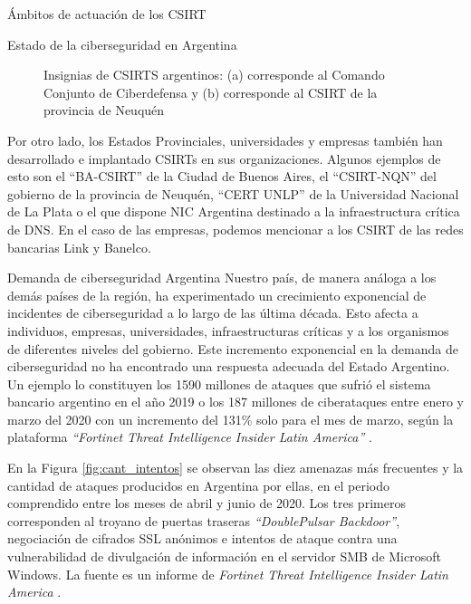 \begin{section}{Ámbitos de actuación de los CSIRT}
\begin{subsection}{Estado de la ciberseguridad en Argentina}
\begin{figure}[H]
            \quad
            \caption{Insignias de CSIRTS argentinos: (a) corresponde al Comando Conjunto de Ciberdefensa y (b) corresponde al CSIRT de la provincia de Neuquén}
            \label{fig:ciberdef_nqn}
        \end{figure}
        \FloatBarrier
        Por otro lado, los Estados Provinciales, universidades y empresas también han desarrollado e implantado CSIRTs en sus organizaciones. Algunos ejemplos de esto son el “BA-CSIRT”\cite{ba_csirt} de la Ciudad de Buenos Aires, el “CSIRT-NQN”\cite{nqn_csirt} del gobierno de la provincia de Neuquén, “CERT UNLP” \cite{unlp_cert} de la Universidad Nacional de La Plata o el que dispone NIC Argentina \cite{nic_arg} destinado a la infraestructura crítica de DNS. En el caso de las empresas, podemos mencionar a los CSIRT de las redes bancarias Link \cite{red_link} y Banelco\cite{banelco}.
            \begin{subsubsection}{Demanda de ciberseguridad Argentina}
            Nuestro país, de manera análoga a los demás países de la región, ha experimentado un crecimiento exponencial de incidentes de ciberseguridad a lo largo de las última década. Esto afecta a individuos, empresas, universidades, infraestructuras críticas y a los organismos de diferentes niveles del gobierno. Este incremento exponencial en la demanda de ciberseguridad no ha encontrado una respuesta adecuada del Estado Argentino. Un ejemplo lo constituyen los 1590 millones de ataques \cite{iProUP} que sufrió el sistema bancario argentino en el año 2019 o los 187 millones de ciberataques entre enero y marzo del 2020 con un incremento del 131\% solo para el mes de marzo, según la plataforma \textit{“Fortinet Threat Intelligence Insider Latin America”} \cite{fortinet}. \par 
            En la Figura \ref{fig:cant_intentos} se observan las diez amenazas más frecuentes y la cantidad de ataques producidos en Argentina por ellas, en el periodo comprendido entre los meses de abril y junio de 2020. Los tres primeros corresponden al troyano de puertas traseras \textit{“DoublePulsar Backdoor”}, negociación de cifrados SSL anónimos e intentos de ataque contra una vulnerabilidad de divulgación de información en el servidor SMB de Microsoft Windows. La fuente es un informe de \textit{Fortinet Threat Intelligence Insider Latin America} \cite{fortinet}.\par

\end{subsubsection}
\end{subsection}
\end{section}

